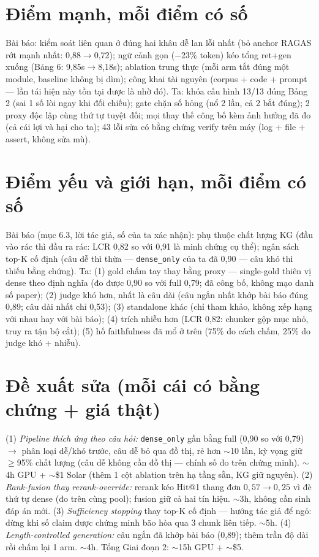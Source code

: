 \documentclass[12pt,a4paper]{article}
\begin{document}
\section{Điểm mạnh, mỗi điểm có số}
Bài báo: kiểm soát liên quan ở đúng hai khâu dễ lan lỗi nhất (bỏ anchor RAGAS
rớt mạnh nhất: 0,88$\rightarrow$0,72); ngữ cảnh gọn ($-$23\% token) kéo tổng
ret+gen xuống (Bảng 6: 9,85s$\rightarrow$8,18s); ablation trung thực (mỗi arm
tắt đúng một module, baseline không bị dìm); công khai tài nguyên (corpus +
code + prompt --- lần tái hiện này tồn tại được là nhờ đó).
Ta: khóa cấu hình 13/13 đúng Bảng 2 (sai 1 số lòi ngay khi đối chiếu); gate
chặn số hỏng (nổ 2 lần, cả 2 bắt đúng); 2 proxy độc lập cùng thứ tự tuyệt đối;
mọi thay thế công bố kèm ảnh hưởng đã đo (cả cái lợi và hại cho ta); 43 lỗi sửa
có bằng chứng verify trên máy (log + file + assert, không sửa mù).

\section{Điểm yếu và giới hạn, mỗi điểm có số}
Bài báo (mục 6.3, lời tác giả, số của ta xác nhận): phụ thuộc chất lượng KG
(đầu vào rác thì đầu ra rác: LCR 0,82 so với 0,91 là minh chứng cụ thể); ngân
sách top-K cố định (câu dễ thì thừa --- \texttt{dense\_only} của ta đã 0,90
--- câu khó thì thiếu bằng chứng).
Ta: (1) gold chấm tay thay bằng proxy --- single-gold thiên vị dense theo định
nghĩa (đo được 0,90 so với full 0,79; đã công bố, không mạo danh số paper);
(2) judge khó hơn, nhất là câu dài (câu ngắn nhất khớp bài báo đúng 0,89; câu
dài nhất chỉ 0,53); (3) standalone khác (chỉ tham khảo, không xếp hạng với
nhau hay với bài báo); (4) trích nhiễu hơn (LCR 0,82: chunker gộp mục nhỏ, truy
ra tận bộ cắt); (5) hố faithfulness đã mổ ở trên (75\% do cách chấm, 25\% do
judge khó + nhiễu).

\section{Đề xuất sửa (mỗi cái có bằng chứng + giá thật)}
(1) \textit{Pipeline thích ứng theo câu hỏi:} \texttt{dense\_only} gần bằng
full (0,90 so với 0,79) $\rightarrow$ phân loại dễ/khó trước, câu dễ bỏ qua đồ
thị, rẻ hơn $\sim$10 lần, kỳ vọng giữ $\ge$95\% chất lượng (câu dễ không cần đồ
thị --- chính số đo trên chứng minh). $\sim$4h GPU + $\sim$\$1 Solar (thêm 1
cột ablation trên hạ tầng sẵn, KG giữ nguyên).
(2) \textit{Rank-fusion thay rerank-override:} rerank kéo Hit@1 thang đơn
$0,57\rightarrow0,25$ vì đè thứ tự dense (đo trên cùng pool); fusion giữ cả hai
tín hiệu. $\sim$3h, không cần sinh đáp án mới.
(3) \textit{Sufficiency stopping} thay top-K cố định --- hướng tác giả để ngỏ:
dừng khi số claim được chứng minh bão hòa qua 3 chunk liên tiếp. $\sim$5h.
(4) \textit{Length-controlled generation:} câu ngắn đã khớp bài báo (0,89);
thêm trần độ dài rồi chấm lại 1 arm. $\sim$4h. Tổng Giai đoạn 2: $\sim$15h GPU
+ $\sim$\$5.
\end{document}
